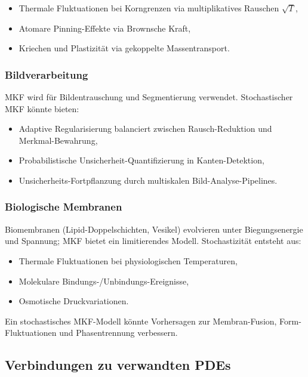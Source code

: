 \documentclass[a4paper,12pt]{article}
\theoremstyle{definition}
\begin{document}
\begin{itemize}
	\item Thermale Fluktuationen bei Korngrenzen via multiplikatives Rauschen $\sqrt{T}$,
	\item Atomare Pinning-Effekte via Brownsche Kraft,
	\item Kriechen und Plastizität via gekoppelte Massentransport.
\end{itemize}

\subsubsection{Bildverarbeitung}

MKF wird für Bildentrauschung und Segmentierung verwendet. Stochastischer MKF könnte bieten:

\begin{itemize}
	\item Adaptive Regularisierung balanciert zwischen Rausch-Reduktion und Merkmal-Bewahrung,
	\item Probabilistische Unsicherheit-Quantifizierung in Kanten-Detektion,
	\item Unsicherheits-Fortpflanzung durch multiskalen Bild-Analyse-Pipelines.
\end{itemize}

\subsubsection{Biologische Membranen}

Biomembranen (Lipid-Doppelschichten, Vesikel) evolvieren unter Biegungsenergie und Spannung; MKF bietet ein limitierendes Modell. Stochastizität entsteht aus:

\begin{itemize}
	\item Thermale Fluktuationen bei physiologischen Temperaturen,
	\item Molekulare Bindungs-/Unbindungs-Ereignisse,
	\item Osmotische Druckvariationen.
\end{itemize}

Ein stochastisches MKF-Modell könnte Vorhersagen zur Membran-Fusion, Form-Fluktuationen und Phasentrennung verbessern.

\subsection{Verbindungen zu verwandten PDEs}
\end{document}

